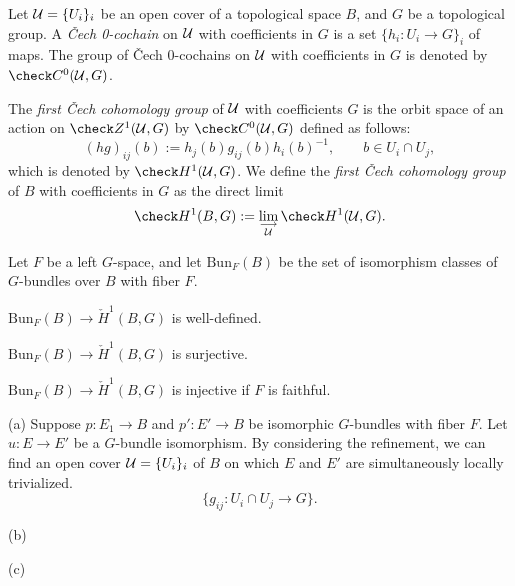 \documentclass{../../large}
\begin{document}
\begin{prb}
Let $\mathcal{U}=\{U_i\}_i$ be an open cover of a topological space $B$, and $G$ be a topological group. 
A \emph{\v Cech 0-cochain} on $\mathcal{U}$ with coefficients in $G$ is a set $\{h_i:U_i\to G\}_i$ of maps.
The group of \v Cech 0-cochains on $\mathcal{U}$ with coefficients in $G$ is denoted by $\check C^0(\cU,G)$.

The \emph{first \v Cech cohomology group} of $\mathcal{U}$ with coefficients $G$ is the orbit space of an action on $\check Z^1(\cU,G)$ by $\check C^0(\cU,G)$ defined as follows:
\[(hg)_{ij}(b):=h_j(b)g_{ij}(b)h_i(b)^{-1},
\qquad b\in U_i\cap U_j,\]
which is denoted by $\check H^1(\cU,G)$.
We define the \emph{first \v Cech cohomology group} of $B$ with coefficients in $G$ as the direct limit
\[\check H^1(B,G):=\lim_{\substack{\longrightarrow\\\cU}}\check H^1(\cU,G).\]

Let $F$ be a left $G$-space, and let $\mathrm{Bun}_F(B)$ be the set of isomorphism classes of $G$-bundles over $B$ with fiber $F$.
\begin{parts}
\item $\mathrm{Bun}_F(B)\to\check H^1(B,G)$ is well-defined.
\item $\mathrm{Bun}_F(B)\to\check H^1(B,G)$ is surjective.
\item $\mathrm{Bun}_F(B)\to\check H^1(B,G)$ is injective if $F$ is faithful.
\end{parts}
\end{prb}
\begin{pf}
(a)
Suppose $p:E_1\to B$ and $p':E'\to B$ be isomorphic $G$-bundles with fiber $F$.
Let $u:E\to E'$ be a $G$-bundle isomorphism.
By considering the refinement, we can find an open cover $\mathcal{U}=\{U_i\}_i$ of $B$ on which $E$ and $E'$ are simultaneously locally trivialized.
\[\{g_{ij}:U_i\cap U_j\to G\}.\]

(b)

(c)
\end{pf}
\end{document}
